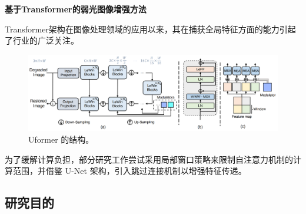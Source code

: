 \documentclass[CJK,aspectratio=169]{beamer}  %
\begin{document}
	\begin{frame}
		{ \yahei \textbf{基于Transformer的弱光图像增强方法}}
		
		{ \yahei Transformer架构\textcolor{blue}{\cite{vaswani2017attention}}在图像处理领域的应用以来\textcolor{blue}{\cite{dosovitskiy2020image}}，其在捕获全局特征方面的能力引起了行业的广泛关注。}
		
		\begin{figure}
			\centering
			\setlength{\abovecaptionskip}{-0.05cm}
			\begin{minipage}{.6\columnwidth}
				\centering
				\includegraphics[width=\columnwidth]{picture/LLIE/Uformer/Uformer}
				\caption{
					\label{fig: Uformer} 
					\tiny Uformer 的结构。
				}
			\end{minipage}
		\end{figure}
		
		{ \yahei 为了缓解计算负担，部分研究工作尝试采用局部窗口策略来限制自注意力机制的计算范围，并借鉴 U-Net 架构，引入跳过连接机制以增强特征传递\textcolor{blue}{\cite{wang2021uformer}}。}
		
		
	\end{frame}
	
	\subsection{研究目的}
	
\end{document}
